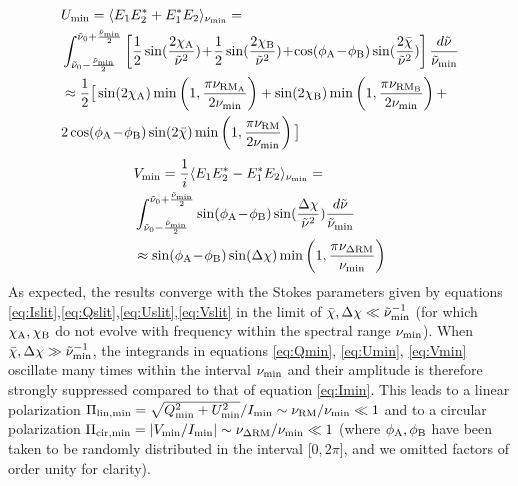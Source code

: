 \documentclass[fleqn,usenatbib]{mnras}
\begin{document}
	\begin{eqnarray}
		\label{eq:Umin}
		& U_{\rm min}=\langle E_{1}E_{2}^*+E_{1}^*E_{2}\rangle_{\nu_{\rm min}}=\\ &
		\int_{\tilde{\nu}_0-\frac{\tilde{\nu}_{\rm min}}{2}}^{\tilde{\nu}_0+\frac{\tilde{\nu}_{\rm min}}{2}}\left[\frac{1}{2}\sin(\frac{2\chi_{\rm A}}{\tilde{\nu}^2})\!+\!\frac{1}{2}\sin(\frac{2\chi_{\rm B}}{\tilde{\nu}^2})\!+\!\cos(\phi_{\rm A}\!-\!\phi_{\rm B})\sin(\frac{2\bar{\chi}}{\tilde{\nu}^2})\right]\frac{d\tilde{\nu}}{\tilde{\nu}_{\rm min}}\nonumber\\&
		\approx \frac{1}{2}\big[\sin(2\chi_{\rm A})\min\left(1,\frac{\pi\nu_{\rm RM_A}}{2\nu_{\rm min}}\right)+\sin(2\chi_{\rm B})\min\left(1,\frac{\pi\nu_{\rm RM_B}}{2\nu_{\rm min}}\right)+\nonumber \\& 2\cos(\phi_{\rm A}\!-\!\phi_{\rm B})\sin(2 \bar{\chi})\min\left(1,\frac{\pi\nu_{\rm RM}}{2\nu_{\rm min}}\right)\big]\nonumber
	\end{eqnarray}
	\begin{eqnarray}
		\label{eq:Vmin}
		& V_{\rm min}=\frac{1}{i}\langle E_{1}E_{2}^*-E_{1}^*E_{2}\rangle_{\nu_{\rm min}}=\\ &
		\int_{\tilde{\nu}_0-\frac{\tilde{\nu}_{\rm min}}{2}}^{\tilde{\nu}_0+\frac{\tilde{\nu}_{\rm min}}{2}}\sin(\phi_{\rm A}\!-\!\phi_{\rm B})\sin(\frac{\Delta\chi}{\tilde{\nu}^2})\frac{d\tilde{\nu}}{\tilde{\nu}_{\rm min}}\nonumber\\&
		\approx \sin(\phi_{\rm A}\!-\!\phi_{\rm B})\sin(\Delta \chi)\min\left(1,\frac{\pi\nu_{\rm \Delta RM}}{\nu_{\rm min}}\right)\nonumber
	\end{eqnarray}
	As expected, the results converge with the Stokes parameters given by equations \ref{eq:Islit},\ref{eq:Qslit},\ref{eq:Uslit},\ref{eq:Vslit} in the limit of $\bar{\chi},\Delta \chi \ll \tilde{\nu}_{\rm min}^{-1}$ (for which $\chi_{\rm A},\chi_{\rm B}$ do not evolve with frequency within the spectral range $\nu_{\rm min}$). 
	When $\bar{\chi},\Delta \chi \gg \tilde{\nu}_{\rm min}^{-1}$, the integrands in equations \ref{eq:Qmin}, \ref{eq:Umin}, \ref{eq:Vmin} oscillate many times within the interval $\nu_{\rm min}$ and their amplitude is therefore strongly suppressed compared to that of equation \ref{eq:Imin}. This leads to a linear polarization $\Pi_{\rm lin,min}=\sqrt{Q_{\rm min}^2+U_{\rm min}^2}/I_{\rm min}\sim\nu_{\rm RM}/\nu_{\rm min}\ll 1$ and to a circular polarization $\Pi_{\rm cir,min}=|V_{\rm min}/I_{\rm min}|\sim \nu_{\rm \Delta RM}/\nu_{\rm min}\ll 1$ (where $\phi_{\rm A},\phi_{\rm B}$ have been taken to be randomly distributed in the interval [$0,2\pi$], and we omitted factors of order unity for clarity).
	
\end{document}
